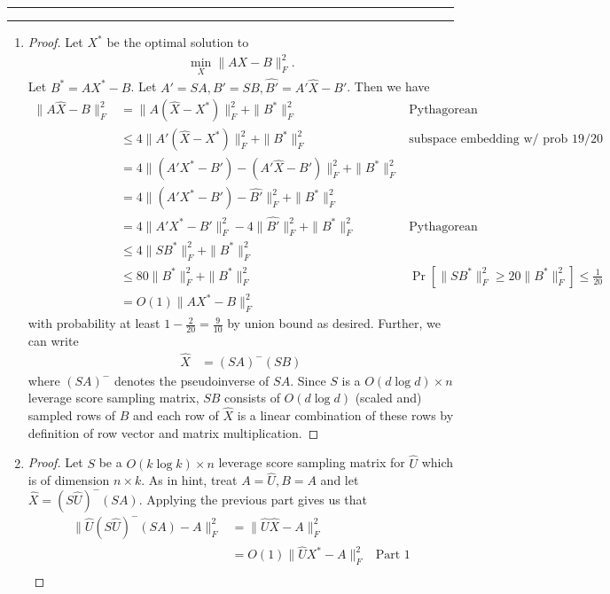 \documentclass[11pt]{article}
\newcommand{\question}[1] {\vspace{.3in} \hrule\vspace{0.3em}
\noindent{\bf #1} \vspace{0.7em}
\hrule \vspace{.10in}}
\begin{document}
\newpage
\question{Task 3}
\begin{enumerate}[1.]
\item \begin{proof}
Let $X^*$ be the optimal solution to
\begin{align*}
  \min_X \|AX - B\|_F^2.
\end{align*}
Let $B^* = AX^* - B$. Let $A' = SA, B' = SB, \widehat{B'} = A'\widehat{X} - B'$. Then we have 
\begin{align*}
  \|A\widehat{X} - B\|_F^2 &= \|A(\widehat{X} - X^*)\|_F^2 + \|B^*\|_F^2 &\text{Pythagorean}\\
  &\le 4\|A'(\widehat{X} - X^*)\|_F^2 + \|B^*\|_F^2 &\text{subspace embedding w/ prob } 19/20\\
  &= 4\|(A'X^* - B') - (A'\widehat{X} - B')\|_F^2 + \|B^*\|_F^2\\
  &= 4\|(A'X^* - B') - \widehat{B'}\|_F^2 + \|B^*\|_F^2\\
  &= 4\|A'X^* - B'\|_F^2 - 4\|\widehat{B'}\|_F^2 + \|B^*\|_F^2 &\text{Pythagorean}\\
  &\le 4\|SB^*\|_F^2 + \|B^*\|_F^2\\
  &\le 80\|B^*\|_F^2 + \|B^*\|_F^2 &\Pr[\|SB^*\|_F^2 \ge 20\|B^*\|_F^2] \le \frac{1}{20}\\
  &= O(1) \|AX^* - B\|_F^2
\end{align*}
with probability at least $1 - \frac{2}{20} = \frac{9}{10}$ by union bound as desired. Further, we can write
\begin{align*}
  \widehat{X} &= (SA)^{-}(SB)
\end{align*}
where $(SA)^{-}$ denotes the pseudoinverse of $SA$. Since $S$ is a $O(d\log d) \times n$ leverage score sampling matrix, $SB$ consists of $O(d\log d)$ (scaled and) sampled rows of $B$ and each row of $\widehat{X}$ is a linear combination of these rows by definition of row vector and matrix multiplication.
\end{proof}
\item \begin{proof}
Let $S$ be a $O(k\log k) \times n$ leverage score sampling matrix for $\widehat{U}$ which is of dimension $n \times k$. As in hint, treat $A = \widehat{U}, B = A$ and let $\widehat{X} = (S\widehat{U})^-(SA)$. Applying the previous part gives us that
\begin{align*}
  \|\widehat{U}(S\widehat{U})^- (SA) - A\|_F^2 &=
  \|\widehat{U} \widehat{X} - A\|_F^2 \\
  &= O(1) \|\widehat{U} X^* - A\|_F^2 &\text{Part 1}\\

\end{align*}
\end{proof}
\end{enumerate}
\end{document}
